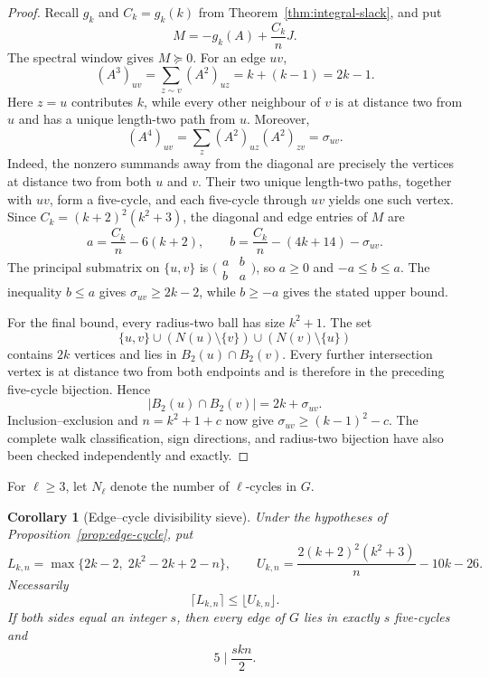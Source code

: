 \documentclass[a4paper,10pt,reqno]{amsart}
\theoremstyle{plain}
\newtheorem{corollary}[theorem]{Corollary}
\theoremstyle{definition}
\theoremstyle{remark}
\newcommand{\resultbox}[1]{\boxed{#1}}
\begin{document}
\begin{proof}
Recall \(g_k\) and \(C_k=g_k(k)\) from
Theorem~\ref{thm:integral-slack}, and put
\[
 M=-g_k(A)+\frac{C_k}{n}J.
\]
The spectral window gives \(M\succeq0\).  For an edge \(uv\),
\[
 (A^3)_{uv}=\sum_{z\sim v}(A^2)_{uz}=k+(k-1)=2k-1.
\]
Here \(z=u\) contributes \(k\), while every other neighbour of \(v\) is at
distance two from \(u\) and has a unique length-two path from \(u\).
Moreover,
\[
 (A^4)_{uv}=\sum_z(A^2)_{uz}(A^2)_{zv}=\sigma_{uv}.
\]
Indeed, the nonzero summands away from the diagonal are precisely the vertices
at distance two from both \(u\) and \(v\).  Their two unique length-two
paths, together with \(uv\), form a five-cycle, and each five-cycle through
\(uv\) yields one such vertex.  Since
\(C_k=(k+2)^2(k^2+3)\), the diagonal and edge entries of \(M\) are
\[
 a=\frac{C_k}{n}-6(k+2),
 \qquad
 b=\frac{C_k}{n}-(4k+14)-\sigma_{uv}.
\]
The principal submatrix on \(\{u,v\}\) is
\(\bigl(\begin{smallmatrix}a&b\\b&a\end{smallmatrix}\bigr)\), so
\(a\ge0\) and \(-a\le b\le a\).  The inequality \(b\le a\) gives
\(\sigma_{uv}\ge2k-2\), while \(b\ge-a\) gives the stated upper bound.

For the final bound, every radius-two ball has size \(k^2+1\).  The set
\[
 \{u,v\}\cup(N(u)\setminus\{v\})\cup(N(v)\setminus\{u\})
\]
contains \(2k\) vertices and lies in \(B_2(u)\cap B_2(v)\).  Every further
intersection vertex is at distance two from both endpoints and is therefore in
the preceding five-cycle bijection.  Hence
\[
 |B_2(u)\cap B_2(v)|=2k+\sigma_{uv}.
\]
Inclusion--exclusion and \(n=k^2+1+c\) now give
\(\sigma_{uv}\ge(k-1)^2-c\).  The complete walk classification, sign
directions, and radius-two bijection have also been checked independently and
exactly.
\end{proof}

For \(\ell\ge3\), let \(N_\ell\) denote the number of
\(\ell\)-cycles in \(G\).

\begin{corollary}[Edge--cycle divisibility sieve]
\label{cor:edge-cycle-sieve}
Under the hypotheses of Proposition~\ref{prop:edge-cycle}, put
\[
 L_{k,n}=\max\{2k-2,\;2k^2-2k+2-n\},
 \qquad
 U_{k,n}=\frac{2(k+2)^2(k^2+3)}{n}-10k-26.
\]
Necessarily
\[
 \resultbox{\lceil L_{k,n}\rceil\le\lfloor U_{k,n}\rfloor.}
\]
If both sides equal an integer \(s\), then every edge of \(G\) lies in
exactly \(s\) five-cycles and
\[
 \resultbox{5\mid \frac{skn}{2}.}
\]
\end{corollary}
\end{document}
